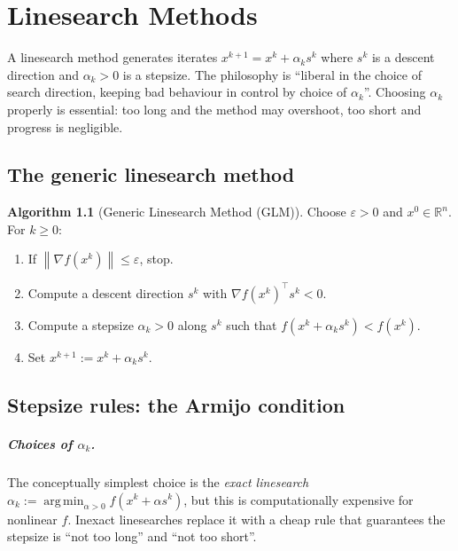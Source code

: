 \documentclass[11pt,a4paper]{report}
\theoremstyle{plain}
\theoremstyle{definition}
\newtheorem{algorithm}[theorem]{Algorithm}
\newcommand{\R}{\mathbb{R}}
\newcommand{\norm}[1]{\left\lVert#1\right\rVert}
\newcommand{\grad}{\nabla}
\DeclareMathOperator*{\argmin}{arg\,min}
\newcommand{\trans}{^{\top}}
\newcommand{\eps}{\varepsilon}
\begin{document}
\chapter{Linesearch Methods}

A linesearch method generates iterates $x^{k+1}=x^{k}+\alpha_{k}s^{k}$ where
$s^{k}$ is a descent direction and $\alpha_{k}>0$ is a stepsize. The philosophy is
``liberal in the choice of search direction, keeping bad behaviour in control by
choice of $\alpha_{k}$''. Choosing $\alpha_{k}$ properly is essential: too long and
the method may overshoot, too short and progress is negligible.

\section{The generic linesearch method}

\begin{algorithm}[Generic Linesearch Method (GLM)]\label{alg:GLM}
Choose $\eps>0$ and $x^{0}\in\R^{n}$. For $k\ge 0$:
\begin{enumerate}[leftmargin=2em,itemsep=0pt]
  \item If $\norm{\grad f(x^{k})}\le\eps$, stop.
  \item Compute a descent direction $s^{k}$ with $\grad f(x^{k})\trans s^{k}<0$.
  \item Compute a stepsize $\alpha_{k}>0$ along $s^{k}$ such that
        $f(x^{k}+\alpha_{k}s^{k})<f(x^{k})$.
  \item Set $x^{k+1}:=x^{k}+\alpha_{k}s^{k}$.
\end{enumerate}
\end{algorithm}

\section{Stepsize rules: the Armijo condition}

\paragraph{Choices of $\alpha_{k}$.} The conceptually simplest choice is the
\emph{exact linesearch}
$\alpha_{k}:=\argmin_{\alpha>0} f(x^{k}+\alpha s^{k})$, but this is computationally
expensive for nonlinear $f$. Inexact linesearches replace it with a cheap rule that
guarantees the stepsize is ``not too long'' and ``not too short''.
\end{document}
